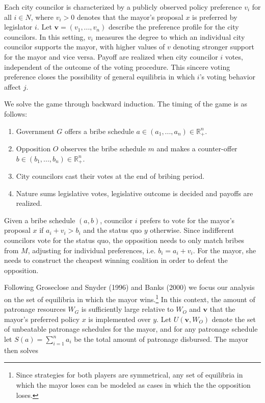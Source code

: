 \documentclass[12pt,a4paper]{article}
\newcommand{\real}{\mathbb{R}_+^n}
\newcommand{\bfv}{\mathbf{v}}
\begin{document}
Each city councilor is characterized by a publicly observed policy preference $v_i$ for all $i \in N$, where $v_i > 0$ denotes that the mayor's proposal $x$ is preferred by legislator $i$. Let $\mathbf{v} = (v_1, ..., v_n)$ describe the preference profile for the city councilors. In this setting, $v_i$ measures the degree to which an individual city councilor supports the mayor, with higher values of $v$ denoting stronger support for the mayor and vice versa. Payoff are realized when city councilor $i$ votes, independent of the outcome of the voting procedure. This sincere voting preference closes the possibility of general equilibria in which $i$'s voting behavior affect $j$.

We solve the game through backward induction. The timing of the game is as follows:

\begin{enumerate}
    \item Government $G$ offers a bribe schedule $a \in (a_1, ..., a_n) \in \real$.
    \item Opposition $O$ observes the bribe schedule $m$ and makes a counter-offer $b \in (b_1, ..., b_n) \in \real$.
    \item City councilors cast their votes at the end of bribing period.
    \item Nature sums legislative votes, legislative outcome is decided and payoffs are realized.
\end{enumerate}

Given a bribe schedule $(a, b)$, councilor $i$ prefers to vote for the mayor's proposal $x$ if $a_i + v_i > b_i$ and the status quo $y$ otherwise. Since indifferent councilors vote for the status quo, the opposition needs to only match bribes from $M$, adjusting for individual preferences, i.e. $b_i = a_i + v_i$. For the mayor, she needs to construct the cheapest winning coalition in order to defeat the opposition. 

Following Groseclose and Snyder (1996) and Banks (2000) we focus our analysis on the set of equilibria in which the mayor wins.\footnote{Since strategies for both players are symmetrical, any set of equilibria in which the mayor loses can be modeled as cases in which the the opposition loses.} In this context, the amount of patronage resources $W_G$ is sufficiently large relative to $W_O$ and $\bfv$ that the mayor's preferred policy $x$ is implemented over $y$. Let $U(\bfv, W_O)$ denote the set of unbeatable patronage schedules for the mayor, and for any patronage schedule let $S(a) = \sum_{i = 1}^n a_i$ be the total amount of patronage disbursed. The mayor then solves
\end{document}
